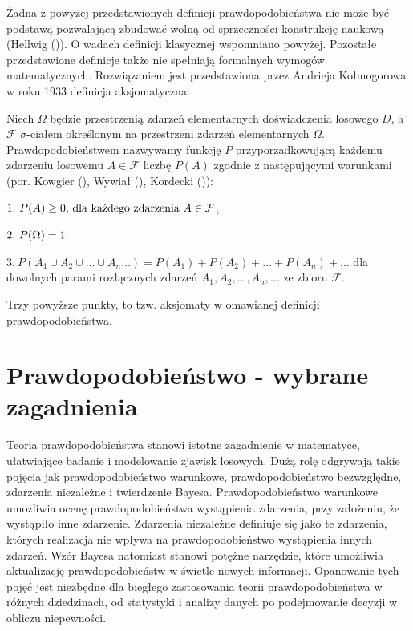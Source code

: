 \documentclass[
  letterpaper,
  DIV=11,
  numbers=noendperiod]{scrreprt}
\begin{document}
Żadna z powyżej przedstawionych definicji prawdopodobieństwa nie może
być podstawą pozwalającą zbudować wolną od sprzeczności konstrukcję
naukową (Hellwig ()). O wadach
definicji klasycznej wspomniano powyżej. Pozostałe przedstawione
definicje także nie spełniają formalnych wymogów matematycznych.
Rozwiązaniem jest przedstawiona przez Andrieja Kołmogorowa w roku 1933
definicja aksjomatyczna.

Niech \(\Omega\) będzie przestrzenią zdarzeń elementarnych doświadczenia
losowego \(D\), a \(\mathcal{F}\) \(\sigma\)-ciałem określonym na
przestrzeni zdarzeń elementarnych \(\Omega\). Prawdopodobieństwem
nazwywamy funkcję \(P\) przyporzadkowującą każdemu zdarzeniu losowemu
\(A \in \mathcal{F}\) liczbę \(P(A)\) zgodnie z następującymi warunkami
(por. Kowgier (), Wywiał
(), Kordecki
()):

\(1. \  P(A) \ge 0 \text{, dla każdego zdarzenia } A \in \mathcal{F} \\\),

\(2. \  P(\Omega) = 1 \\\)

\(3. \ P(A_1 \cup A_2 \cup \ldots \cup A_n \ldots )=P(A_1)+P(A_2)+\ldots+P(A_n) + \ldots\)
dla dowolnych parami rozłącznych zdarzeń
\(A_1, A_2, \ldots, A_n, \ldots \text{ ze zbioru } \mathcal{F}\).

Trzy powyższe punkty, to tzw. aksjomaty w omawianej definicji
prawdopodobieństwa.

\section{Prawdopodobieństwo - wybrane
zagadnienia}\label{prawdopodobieux144stwo---wybrane-zagadnienia}

Teoria prawdopodobieństwa stanowi istotne zagadnienie w matematyce,
ułatwiające badanie i modelowanie zjawisk losowych. Dużą rolę odgrywają
takie pojęcia jak prawdopodobieństwo warunkowe, prawdopodobieństwo
bezwzględne, zdarzenia niezależne i twierdzenie Bayesa.
Prawdopodobieństwo warunkowe umożliwia ocenę prawdopodobieństwa
wystąpienia zdarzenia, przy założeniu, że wystąpiło inne zdarzenie.
Zdarzenia niezależne definiuje się jako te zdarzenia, których realizacja
nie wpływa na prawdopodobieństwo wystąpienia innych zdarzeń. Wzór Bayesa
natomiast stanowi potężne narzędzie, które umożliwia aktualizację
prawdopodobieństw w świetle nowych informacji. Opanowanie tych pojęć
jest niezbędne dla biegłego zastosowania teorii prawdopodobieństwa w
różnych dziedzinach, od statystyki i analizy danych po podejmowanie
decyzji w obliczu niepewności.
\end{document}
